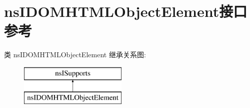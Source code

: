 \hypertarget{interfacens_i_d_o_m_h_t_m_l_object_element}{}\section{ns\+I\+D\+O\+M\+H\+T\+M\+L\+Object\+Element接口 参考}
\label{interfacens_i_d_o_m_h_t_m_l_object_element}
类 ns\+I\+D\+O\+M\+H\+T\+M\+L\+Object\+Element 继承关系图\+:\begin{figure}[H]
\begin{center}
\leavevmode
\includegraphics[height=2.000000cm]{interfacens_i_d_o_m_h_t_m_l_object_element}
\end{center}
\end{figure}
